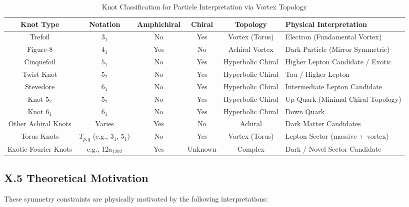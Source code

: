 \documentclass[11pt]{article}
\begin{document}
    \begin{table}[H]
        \centering
        \begin{tabular}{|c|c|c|c|c|l|}
            \hline
            \textbf{Knot Type} & \textbf{Notation} & \textbf{Amphichiral} & \textbf{Chiral} & \textbf{Topology} & \textbf{Physical Interpretation} \\
            \hline
            Trefoil & $3_1$ & No & Yes & Vortex (Torus) & Electron (Fundamental Vortex) \\
            \hline
            Figure-8 & $4_1$ & Yes & No & Achiral Vortex & Dark Particle (Mirror Symmetric) \\
            \hline
            Cinquefoil & $5_1$ & No & Yes & Hyperbolic Chiral & Higher Lepton Candidate / Exotic \\
            \hline
            Twist Knot & $5_2$ & No & Yes & Hyperbolic Chiral & Tau / Higher Lepton \\
            \hline
            Stevedore & $6_1$ & No & Yes & Hyperbolic Chiral & Intermediate Lepton Candidate \\
            \hline
            Knot $5_2$ & $5_2$ & No & Yes & Hyperbolic Chiral & Up Quark (Minimal Chiral Topology) \\
            \hline
            Knot $6_1$ & $6_1$ & No & Yes & Hyperbolic Chiral & Down Quark \\
            \hline
            Other Achiral Knots & Varies & Yes & No & Achiral & Dark Matter Candidates \\
            \hline
            Torus Knots & $T_{p,q}$ (e.g., $3_1$, $5_1$) & No & Yes & Vortex (Torus) & Lepton Sector (massive + vortex) \\
            \hline
            Exotic Fourier Knots & e.g., 12a$_{1202}$ & Yes & Unknown & Complex & Dark / Novel Sector Candidate \\
            \hline
        \end{tabular}
        \caption{Knot Classification for Particle Interpretation via Vortex Topology}
        \label{tab:knot_classification}
    \end{table}



    \subsection*{X.5 Theoretical Motivation}

    These symmetry constraints are physically motivated by the following interpretations:
\end{document}

